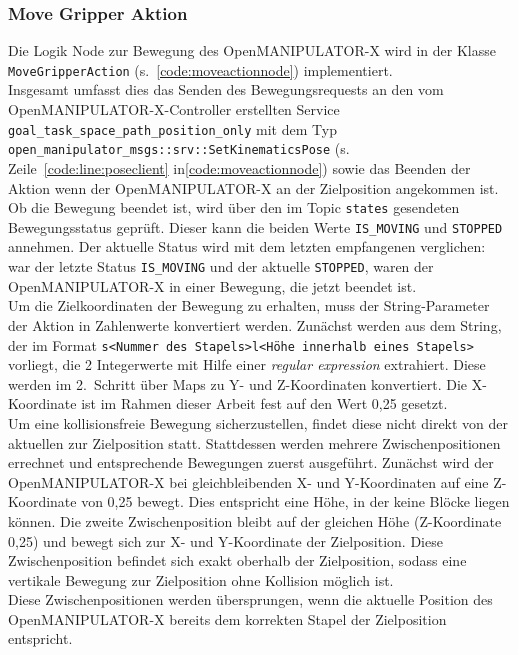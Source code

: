 \subsubsection{Move Gripper Aktion}
Die Logik Node zur Bewegung des OpenMANIPULATOR-X wird in der Klasse\\\verb|MoveGripperAction| (s.~\ref{code:moveactionnode}) implementiert.\\
Insgesamt umfasst dies das Senden des Bewegungsrequests an den vom OpenMANIPULATOR-X-Controller erstellten Service \verb|goal_task_space_path_position_only| mit dem Typ \verb|open_manipulator_msgs::srv::SetKinematicsPose| (s. Zeile~\ref{code:line:poseclient} in\ref{code:moveactionnode}) sowie das Beenden der Aktion wenn der OpenMANIPULATOR-X an der Zielposition angekommen ist.
Ob die Bewegung beendet ist, wird über den im Topic \verb|states| gesendeten Bewegungsstatus geprüft.
Dieser kann die beiden Werte \verb|IS_MOVING| und \verb|STOPPED| annehmen.
Der aktuelle Status wird mit dem letzten empfangenen verglichen: war der letzte Status \verb|IS_MOVING| und der aktuelle \verb|STOPPED|, waren der OpenMANIPULATOR-X in einer Bewegung, die jetzt beendet ist.\\
Um die Zielkoordinaten der Bewegung zu erhalten, muss der String-Parameter der Aktion in Zahlenwerte konvertiert werden.
Zunächst werden aus dem String, der im Format \verb|s<Nummer des Stapels>l<Höhe innerhalb eines Stapels>| vorliegt, die 2 Integerwerte mit Hilfe einer \emph{regular expression} extrahiert.
Diese werden im 2.\ Schritt über Maps zu Y- und Z-Koordinaten konvertiert.
Die X-Koordinate ist im Rahmen dieser Arbeit fest auf den Wert 0,25 gesetzt.\\
Um eine kollisionsfreie Bewegung sicherzustellen, findet diese nicht direkt von der aktuellen zur Zielposition statt.
Stattdessen werden mehrere Zwischenpositionen errechnet und entsprechende Bewegungen zuerst ausgeführt.
Zunächst wird der OpenMANIPULATOR-X bei gleichbleibenden X- und Y-Koordinaten auf eine Z-Koordinate von 0,25 bewegt.
Dies entspricht eine Höhe, in der keine Blöcke liegen können.
Die zweite Zwischenposition bleibt auf der gleichen Höhe (Z-Koordinate 0,25) und bewegt sich zur X- und Y-Koordinate der Zielposition.
Diese Zwischenposition befindet sich exakt oberhalb der Zielposition, sodass eine vertikale Bewegung zur Zielposition ohne Kollision möglich ist.\\
Diese Zwischenpositionen werden übersprungen, wenn die aktuelle Position des OpenMANIPULATOR-X bereits dem korrekten Stapel der Zielposition entspricht.

